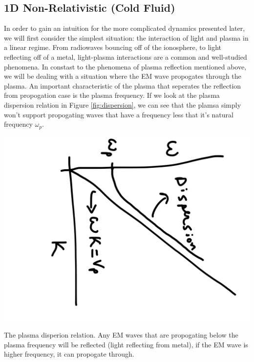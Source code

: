 \documentclass[12pt, titlepage]{article}
\begin{document}
\begin{marginfigure}
\marginskip{90pt}
	\end{marginfigure}
    \subsection{1D Non-Relativistic (Cold Fluid)}
    In order to gain an intuition for the more complicated dynamics presented
    later, we will first consider the simplest situation: the interaction of
    light and plasma in a linear regime. From radiowaves bouncing off of the
    ionosphere, to light reflecting off of a metal, light-plasma interactions
    are a common and well-studied phenomena. In constast to the phenomena of
    plasma reflection mentioned above, we will be dealing with a situation 
    where the EM wave propogates through the plasma.
    An important characteristic of the plasma that seperates the reflection
    from propogation case is the plasma frequency. If we look at the plasma
    dispersion relation in Figure \ref{fig:dispersion}, we can see that the
    plamsa simply won't support propogating waves that have a frequency less
    that it's natural frequency $\omega_p$. 


\begin{marginfigure}
    \includegraphics[angle=90, width =.6\marginparwidth]{../figures/disp.png}
    \caption{\label{fig:dispersion}The plasma disperion relation. Any EM waves that are propogating
        below the plasma frequency will be reflected (light reflecting from
        metal), if the EM wave is higher frequency, it can propogate through.}
    \end{marginfigure}
\end{document}
